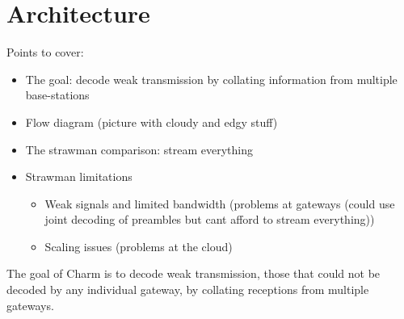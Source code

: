 \section{Architecture}
\label{sec:arch}

{\color{blue} Points to cover:

\begin{itemize}
    \item The goal: decode weak transmission by collating information from multiple base-stations
    \item Flow diagram (picture with cloudy and edgy stuff)
    \item The strawman comparison: stream everything
    \item Strawman limitations
        \begin{itemize}
            \item Weak signals and limited bandwidth (problems at gateways (could use joint decoding of preambles but cant afford to stream everything))
            \item Scaling issues (problems at the cloud)
        \end{itemize}
\end{itemize}
}

The goal of Charm is to decode weak transmission, those that could not be
decoded by any individual gateway, by collating receptions from multiple
gateways.